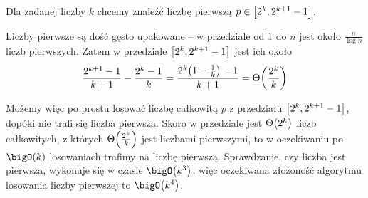 Dla zadanej liczby \( k \) chcemy znaleźć liczbę pierwszą \( p \in \left[2^k, 2^{k+1}-1\right] \).

Liczby pierwsze są dość gęsto upakowane -- w przedziale od 1 do \( n \) jest około \( \frac{n}{\log n} \) liczb pierwszych.
Zatem w przedziale \( \left[2^k, 2^{k+1}-1\right] \) jest ich około
\[
	\frac{2^{k+1} - 1}{k+1} - \frac{2^{k} - 1}{k} = \frac{2^k\pars{1-\frac{1}{k}} - 1}{k+1} = \Theta\pars{\frac{2^k}{k}}
\]

Możemy więc po prostu losować liczbę całkowitą \( p \) z przedziału \( \left[2^k, 2^{k+1}-1\right] \), dopóki nie trafi się liczba pierwsza.
Skoro w przedziale jest \( \Theta\pars{2^k} \) liczb całkowitych, z których \( \Theta\pars{\frac{2^k}{k}} \) jest liczbami pierwszymi, to w oczekiwaniu po \( \bigO(k) \) losowaniach trafimy na liczbę pierwszą.
Sprawdzanie, czy liczba jest pierwsza, wykonuje się w czasie \( \bigO\pars{k^3} \), więc oczekiwana złożoność algorytmu losowania liczby pierwszej to \( \bigO\pars{k^4} \).